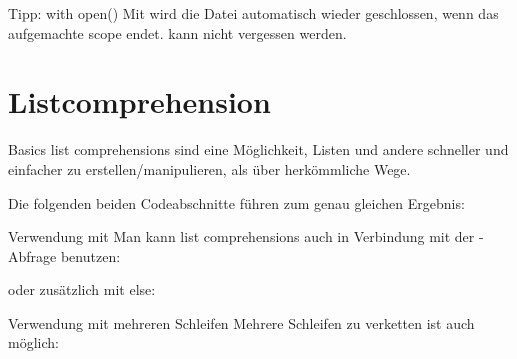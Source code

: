 \begin{frame}{Tipp: with open()}
	Mit  wird die Datei automatisch wieder geschlossen, wenn das aufgemachte scope endet.  kann nicht vergessen werden. 
	
\end{frame}

\section{Listcomprehension}
\begin{frame}{Basics}
	\alert{list comprehensions} sind eine Möglichkeit, Listen und andere  schneller und einfacher zu erstellen/manipulieren, als über herkömmliche Wege.
	
	Die folgenden beiden Codeabschnitte führen zum genau gleichen Ergebnis:	
	
	
	
\end{frame}

\begin{frame}{Verwendung mit }
	Man kann 	\alert{list comprehensions} auch in Verbindung mit der -Abfrage benutzen:
	
	
	oder zusätzlich mit else:	
	
	
\end{frame}

\begin{frame}{Verwendung mit mehreren Schleifen}
	Mehrere Schleifen zu verketten ist auch möglich:
	
\end{frame}


